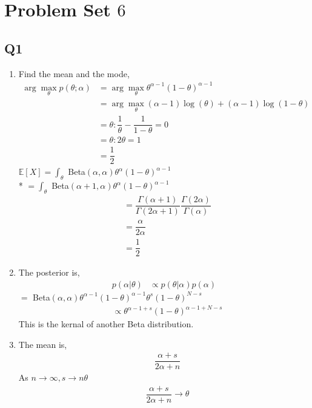 \documentclass{article}
\begin{document}
\section{Problem Set $6$} 


\subsection{Q1}
\begin{enumerate}
\item Find the mean and the mode,
\begin{align*}
\arg\displaystyle\max_{\theta} p\left(\theta; \alpha\right) &= \arg\displaystyle\max_{\theta} \theta^{\alpha-1} \left(1 - \theta\right)^{\alpha-1}
\\ &= \arg\displaystyle\max_{\theta} \left(\alpha - 1\right) \log\left(\theta\right) + \left(\alpha - 1\right) \log\left(1 - \theta\right)
\\ &= \theta : \dfrac{1}{\theta} - \dfrac{1}{1 - \theta} = 0
\\ &= \theta : 2 \theta = 1
\\ &= \dfrac{1}{2}
\end{align*}
$\mathbb{E}\left[X\right] = \displaystyle\int_{\theta}$ Beta$\left(\alpha, \alpha\right) \theta^{\alpha} \left(1 - \theta\right)^{\alpha-1}$
\\* $= \displaystyle\int_{\theta}$ Beta$\left(\alpha + 1, \alpha\right) \theta^{\alpha} \left(1 - \theta\right)^{\alpha-1}$
\begin{align*}
&= \dfrac{\Gamma\left(\alpha + 1\right)}{\Gamma\left(2 \alpha + 1\right)} \dfrac{\Gamma\left(2 \alpha\right)}{\Gamma\left(\alpha\right)}
\\ &= \dfrac{\alpha}{2 \alpha}
\\ &= \dfrac{1}{2}
\end{align*}
\item The posterior is,
\begin{align*}
p\left(\alpha | \theta\right)  &  \propto p\left(\theta | \alpha\right) p\left(\alpha\right)
\end{align*}
$=$ Beta$\left(\alpha, \alpha\right) \theta^{\alpha-1} \left(1 - \theta\right)^{\alpha-1} \theta^{s} \left(1 - \theta\right)^{N-s}$
\begin{align*}
&\propto \theta^{\alpha-1+s} \left(1 - \theta\right)^{\alpha-1+N-s}
\end{align*}
This is the kernal of another Beta distribution.

\item The mean is,
\begin{align*}
&\dfrac{\alpha + s}{2 \alpha + n}
\end{align*}
As $n  \to  \infty, s  \to  n \theta$
\begin{align*}
&\dfrac{\alpha + s}{2 \alpha + n} \to  \theta
\end{align*}
\end{enumerate}
\end{document}
